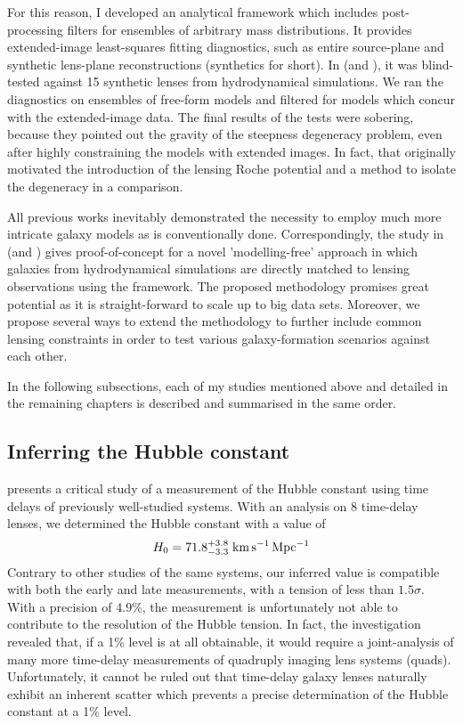 For this reason, I developed an analytical framework  \cite{gleam}
which includes post-processing filters for ensembles of arbitrary mass
distributions.  It provides extended-image least-squares fitting diagnostics,
such as entire source-plane and synthetic lens-plane reconstructions (synthetics
for short).  In  (and ), it was blind-tested
against 15 synthetic lenses from hydrodynamical simulations.  We ran the
diagnostics on ensembles of free-form models and filtered for models which
concur with the extended-image data.  The final results of the tests were
sobering, because they pointed out the gravity of the steepness degeneracy
problem, even after highly constraining the models with extended images.  In
fact, that originally motivated the introduction of the lensing Roche potential
and a method to isolate the degeneracy in a comparison.

All previous works inevitably demonstrated the necessity to employ much more
intricate galaxy models as is conventionally done.  Correspondingly, the study
in  (and ) gives proof-of-concept for a novel
'modelling-free' approach in which galaxies from hydrodynamical simulations are
directly matched to lensing observations using the  framework.  The
proposed methodology promises great potential as it is straight-forward to scale
up to big data sets.  Moreover, we propose several ways to extend the
methodology to further include common lensing constraints in order to test
various galaxy-formation scenarios against each other.

In the following subsections, each of my studies mentioned above and detailed in
the remaining chapters is described and summarised in the same order.

\subsection{Inferring the Hubble constant}

 presents a critical study of a measurement of the Hubble constant
using time delays of previously well-studied systems.  With an analysis on 8
time-delay lenses, we determined the Hubble constant with a value of
%
\begin{equation*}%
    \Ho = 71.8^{+3.8}_{-3.3}\;\Hunitsalt
\end{equation*}%
%
Contrary to other studies of the same systems, our inferred value is compatible
with both the early and late measurements, with a tension of less than
$1.5\sigma$.  With a precision of 4.9\%, the measurement is unfortunately not
able to contribute to the resolution of the Hubble tension.  In fact, the
investigation revealed that, if a 1\% level is at all obtainable, it would
require a joint-analysis of many more time-delay measurements of quadruply
imaging lens systems (quads).  Unfortunately, it cannot be ruled out that
time-delay galaxy lenses naturally exhibit an inherent scatter which prevents a
precise determination of the Hubble constant at a 1\% level.  

